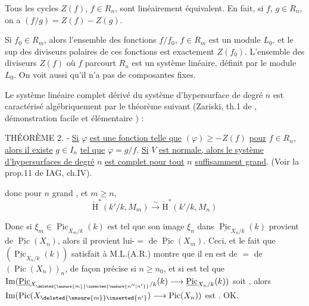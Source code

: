 Tous les cycles $Z(f)$, $f\in R_n$, sont linéairement équivalent. En fait, si $f$, $g\in R_n$, on a $(f/g)=Z(f)-Z(g)$.

Si $f_0\in R_m$, alors l'ensemble des fonctions $f/f_0$, $f\in R_m$ est un module $L_0$, et le sup des diviseurs polaires de ces fonctions est exactement $Z(f_0)$. L'ensemble des diviseurs $Z(f)$ où $f$ parcourt $R_n$ est un système linéaire, définit par le module $L_0$. On voit aussi qu'il n'a pas de composantes fixes.

Le système linéaire complet dérivé du système d'hypersurface de degré $n$ est caractérisé algébriquement par le théorème suivant (Zariski, th.1 de , démonstration facile et élémentaire ) :

THÉORÈME 2. - \uline{Si} $\varphi$ \uline{est une fonction telle que} $(\varphi)\geq-Z(f)$ \uline{pour} $f\in R_n$, \uline{alors il existe} $g\in I_n$ \uline{tel que} $\varphi=g/f$. \uline{Si} $V$ \uline{est normale, alors le système d'hypersurfaces de degré} $n$ \uline{est complet pour tout} $n$ \uline{suffisamment grand}. (Voir la prop.11 de IAG, ch.IV).



donc pour $n$ grand , et $m\geq n$,
\[
\check{\mathrm H}^{*}(k'/k,M_m)\xrightarrow{\sim}\check{\mathrm H}^{*}(k'/k,M_n)
\]


 Donc si $\xi_m\in\underline{\operatorname{Pic}}_{X_m/k}(k)$ est tel que son image $\xi_n$ dans $\underline{\operatorname{Pic}}_{X_n/k}(k)$ provient de $\underline{\operatorname{Pic}}(X_n)$, alors il provient lui-$=$ de $\underline{\operatorname{Pic}}(X_m)$. Ceci, et le fait que $(\underline{\operatorname{Pic}}_{X_n/k}(k))$ satisfait à M.L.(A.R.) montre que il en est de $=$ de $(\operatorname{Pic}(X_n))_n$, de façon précise si $n\geq n_0$,  et si  est tel que $\operatorname{Im}(\underline{\operatorname{Pic}}_{X_{\deleted{\unsure{m}}\inserted{\unsure{n''|n'}}}/k}(k)\longrightarrow\underline{\operatorname{Pic}}_{X_n/k}(k))$ soit , alors $\operatorname{Im}(\operatorname{Pic}(X_{\deleted{\unsure{m}}\inserted{n'}})\longrightarrow\operatorname{Pic}(X_n))$ est . OK.

